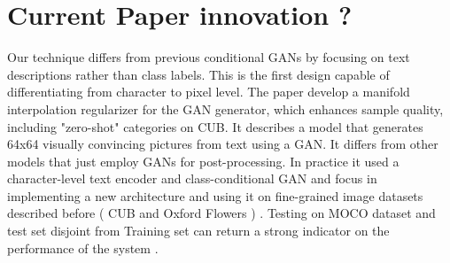 
\section*{Current Paper innovation ? }
Our technique differs from previous conditional GANs by focusing on text descriptions rather than class labels. 
This is the first design capable of differentiating from character to pixel level. 
The paper develop a manifold interpolation regularizer for the GAN generator, 
which enhances sample quality, including "zero-shot" categories on CUB.
It describes a model that generates 64x64 visually convincing pictures from text using a GAN. 
It differs from other models that just employ GANs for post-processing.
In practice it used a character-level text encoder and class-conditional GAN and 
focus in implementing a new architecture and using it on fine-grained  
image datasets described before ( CUB and Oxford Flowers ) .
Testing on MOCO dataset and test set disjoint from Training set 
can return a strong indicator on the performance of the system .
